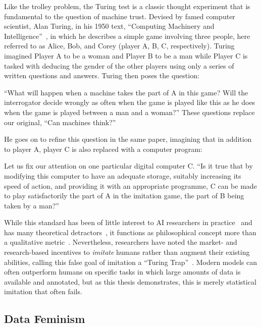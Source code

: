 Like the trolley problem, the Turing test is a classic thought experiment that is fundamental to the question of machine trust. 
Devised by famed computer scientist, Alan Turing, in his 1950 text, ``Computing Machinery and Intelligence''~\cite{turing}, in which he describes a simple game involving three people, here referred to as Alice, Bob, and Corey (player A, B, C, respectively). 
Turing imagined Player A to be a woman and Player B to be a man while Player C is tasked with deducing the gender of the other players using only a series of written questions and answers.
Turing then poses the question:
\begin{displayquote}
    ``What will happen when a machine takes the part of A in this game? Will the interrogator decide wrongly as often when the game is played like this as he does when the game is played between a man and a woman?'' These questions replace our original, ``Can machines think?''
\end{displayquote}
He goes on to refine this question in the same paper, imagining that in addition to player A, player C is also replaced with a computer program:
\begin{displayquote}
    Let us fix our attention on one particular digital computer C. ``Is it true that by modifying this computer to have an adequate storage, suitably increasing its speed of action, and providing it with an appropriate programme, C can be made to play satisfactorily the part of A in the imitation game, the part of B being taken by a man?''
\end{displayquote}
While this standard has been of little interest to AI researchers in practice~\cite{turingtestcritique2} and has many theoretical detractors~\cite{turingtestcritique1,turingtestcritique2,turingtestcritique3}, it functions as philosophical concept more than a qualitative metric~\cite{turingtest_not_metric}.
Nevertheless, researchers have noted the market- and research-based incentives to \textit{imitate} humans rather than augment their existing abilities, calling this false goal of imitation a ``Turing Trap''~\cite{turingtrap}.
Modern models can often outperform humans on specific tasks in which large amounts of data is available and annotated, but as this thesis demonstrates, this is merely statistical imitation that often fails. 


\subsection{Data Feminism}

